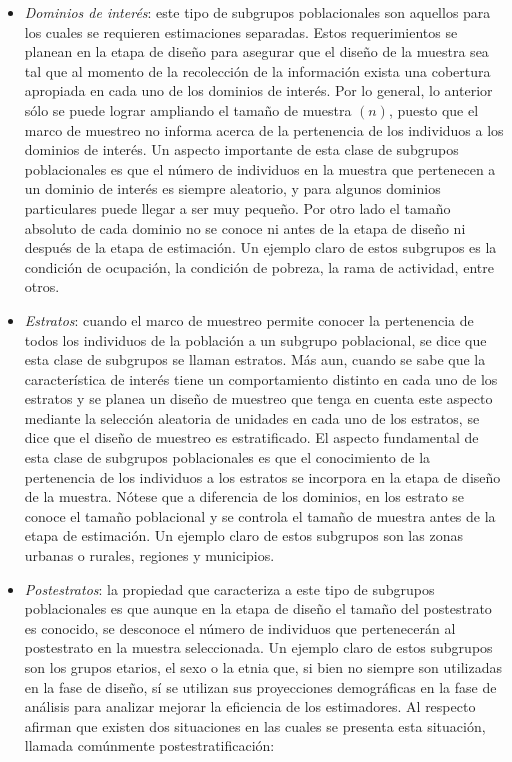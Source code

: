 \documentclass[
  12pt,
  spanish,
]{book}
\begin{document}
\begin{itemize}
\item
  \emph{Dominios de interés}: este tipo de subgrupos poblacionales son aquellos para los cuales se requieren estimaciones separadas. Estos requerimientos se planean en la etapa de diseño para asegurar que el diseño de la muestra sea tal que al momento de la recolección de la información exista una cobertura apropiada en cada uno de los dominios de interés. Por lo general, lo anterior sólo se puede lograr ampliando el tamaño de muestra \((n)\), puesto que el marco de muestreo no informa acerca de la pertenencia de los individuos a los dominios de interés. Un aspecto importante de esta clase de subgrupos poblacionales es que el número de individuos en la muestra que pertenecen a un dominio de interés es siempre aleatorio, y para algunos dominios particulares puede llegar a ser muy pequeño. Por otro lado el tamaño absoluto de cada dominio no se conoce ni antes de la etapa de diseño ni después de la etapa de estimación. Un ejemplo claro de estos subgrupos es la condición de ocupación, la condición de pobreza, la rama de actividad, entre otros.
\item
  \emph{Estratos}: cuando el marco de muestreo permite conocer la pertenencia de todos los individuos de la población a un subgrupo poblacional, se dice que esta clase de subgrupos se llaman estratos. Más aun, cuando se sabe que la característica de interés tiene un comportamiento distinto en cada uno de los estratos y se planea un diseño de muestreo que tenga en cuenta este aspecto mediante la selección aleatoria de unidades en cada uno de los estratos, se dice que el diseño de muestreo es estratificado. El aspecto fundamental de esta clase de subgrupos poblacionales es que el conocimiento de la pertenencia de los individuos a los estratos se incorpora en la etapa de diseño de la muestra. Nótese que a diferencia de los dominios, en los estrato se conoce el tamaño poblacional y se controla el tamaño de muestra antes de la etapa de estimación. Un ejemplo claro de estos subgrupos son las zonas urbanas o rurales, regiones y municipios.
\item
  \emph{Postestratos}: la propiedad que caracteriza a este tipo de subgrupos poblacionales es que aunque en la etapa de diseño el tamaño del postestrato es conocido, se desconoce el número de individuos que pertenecerán al postestrato en la muestra seleccionada. Un ejemplo claro de estos subgrupos son los grupos etarios, el sexo o la etnia que, si bien no siempre son utilizadas en la fase de diseño, sí se utilizan sus proyecciones demográficas en la fase de análisis para analizar mejorar la eficiencia de los estimadores. Al respecto \citet{Sarndal_Swensson_Wretman_2003} afirman que existen dos situaciones en las cuales se presenta esta situación, llamada comúnmente postestratificación:


\end{itemize}
\end{document}
